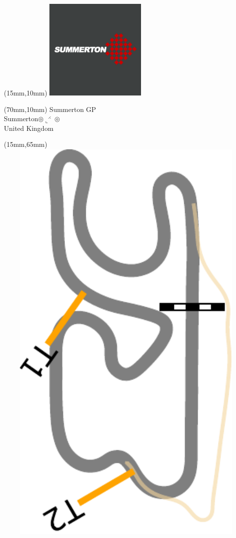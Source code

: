 \null\newpage
\begin{textblock*}{50mm}(15mm,10mm)%
\includegraphics[width=50mm]{LG/SUMM.png}
\end{textblock*}
\begin{textblock*}{130mm}(70mm,10mm)%
{\fontsize{20}{20}\selectfont Summerton GP\\}
{\fontsize{16}{16}\selectfont Summerton\hfill $\circledcirc\llcorner^{\rightthreetimes}\circledcirc$\\}
{\fontsize{12}{12}\selectfont United Kingdom\\}
\end{textblock*}
\begin{textblock*}{185mm}(15mm,65mm)%
\centering
\mbox{\includegraphics[width=185mm,height=210mm,keepaspectratio]{PT/SUMMGP.pdf}}
\end{textblock*}
